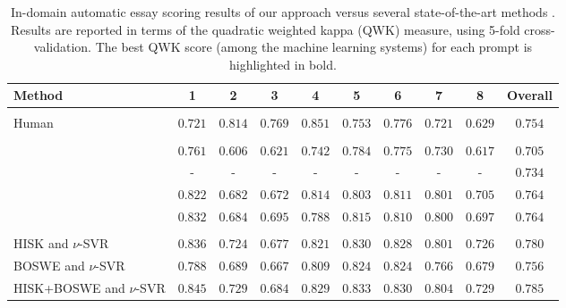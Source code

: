 \documentclass[11pt,a4paper]{article}
\begin{document}
\begin{table*}[!t]
\setlength\tabcolsep{3.5pt}
\begin{center}
\begin{tabular}{lccccccccc}
\hline
Method 											& 1								&	2								& 3								& 4 						
					& 5 								& 6								& 7 								& 8 								& Overall\\
\hline
\hline
\vspace{-0.9em}\\
Human												& $0.721$ 					& $0.814$ 					& $0.769$ 					& $0.851$
					& $0.753$ 					& $0.776$ 					& $0.721$					& $0.629$					& $0.754$\\
\hline
\vspace{-0.9em}\\
\cite{Phandi-EMNLP-2015}				& $0.761$ 					& $0.606$ 					& $0.621$ 					& $0.742$
					& $0.784$ 					& $0.775$ 					& $0.730$					& $0.617$					& $0.705$\\
															
\cite{Dong-EMNLP-2016}				& - 								& - 								& - 								& -
					& - 								& - 								& -								& -								& $0.734$\\
															
\cite{Dong-CONLL-2017}				& $0.822$ 					& $0.682$ 					& $0.672$ 					& $0.814$
					& $0.803$ 					& $0.811$ 					& $0.801$					& $0.705$ 					& $0.764$\\
																									
\cite{Tay-ACL-2018}						& $0.832$ 					& $0.684$ 					& $\mathbf{0.695}$ 	& $0.788$
					& $0.815$ 					& $0.810$ 					& $0.800$					& $0.697$					& $0.764$\\
\hline
\vspace{-0.9em}\\
HISK and $\nu$-SVR						& $0.836$ 					& $0.724$ 					& $0.677$ 					& $0.821$
					& $0.830$ 					& $0.828$ 					& $0.801$					& $0.726$					& $0.780$\\
																					
BOSWE and $\nu$-SVR					& $0.788$ 					& $0.689$ 					& $0.667$ 					& $0.809$
					& $0.824$ 					& $0.824$ 					& $0.766$					& $0.679$					& $0.756$\\
																					
HISK+BOSWE and $\nu$-SVR			& $\mathbf{0.845}$ 	& $\mathbf{0.729}$ 	& $0.684$ 					& $\mathbf{0.829}$
					& $\mathbf{0.833}$	& $\mathbf{0.830}$	& $\mathbf{0.804}$	& $\mathbf{0.729}$	& $\mathbf{0.785}$\\
\hline
\end{tabular}
\end{center}
\vspace*{-0.2cm}
\caption{In-domain automatic essay scoring results of our approach versus several state-of-the-art methods \cite{Phandi-EMNLP-2015,Dong-EMNLP-2016,Dong-CONLL-2017,Tay-ACL-2018}. Results are reported in terms of the quadratic weighted kappa (QWK) measure, using 5-fold cross-validation. The best QWK score (among the machine learning systems) for each prompt is highlighted in bold.}
\label{tab_AES_in}
\vspace*{-0.3cm}
\end{table*}
\end{document}
